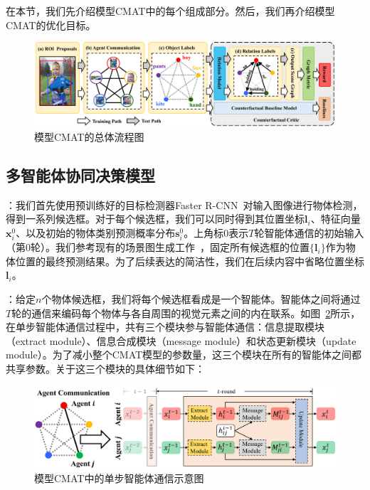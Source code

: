 在本节，我们先介绍模型CMAT中的每个组成部分。然后，我们再介绍模型CMAT的优化目标。

\begin{figure}[t]
    \centering
    \includegraphics[width=\linewidth]{chapter4/res/architecture.pdf}
    \caption{模型CMAT的总体流程图}
    \label{ch4:fig:architecture}
\end{figure}

\subsection{多智能体协同决策模型}

\textbf{}：我们首先使用预训练好的目标检测器Faster R-CNN~\cite{ren2015faster}对输入图像进行物体检测，得到一系列候选框。对于每个候选框，我们可以同时得到其位置坐标$\bm{l}_i$、特征向量$\bm{x}^0_i$、以及初始的物体类别预测概率分布$\bm{s}^0_i$。上角标$0$表示$T$轮智能体通信的初始输入（第0轮）。我们参考现有的场景图生成工作~\cite{xu2017scene, zellers2018neural}，固定所有候选框的位置$\{\bm{l}_i\}$作为物体位置的最终预测结果。为了后续表达的简洁性，我们在后续内容中省略位置坐标$\bm{l}_i$。


\textbf{}：给定$n$个物体候选框，我们将每个候选框看成是一个智能体。智能体之间将通过$T$轮的通信来编码每个物体与各自周围的视觉元素之间的内在联系。如图~\ref{ch4:fig:communication}所示，在单步智能体通信过程中，共有三个模块参与智能体通信：信息提取模块（extract module）、信息合成模块（message module）和状态更新模块（update module）。为了减小整个CMAT模型的参数量，这三个模块在所有的智能体之间都共享参数。关于这三个模块的具体细节如下：

\begin{figure}[t]
    \centering
    \includegraphics[width=\linewidth]{chapter4/res/communication.pdf}
    \caption{模型CMAT中的单步智能体通信示意图}
    \label{ch4:fig:communication}
\end{figure}

